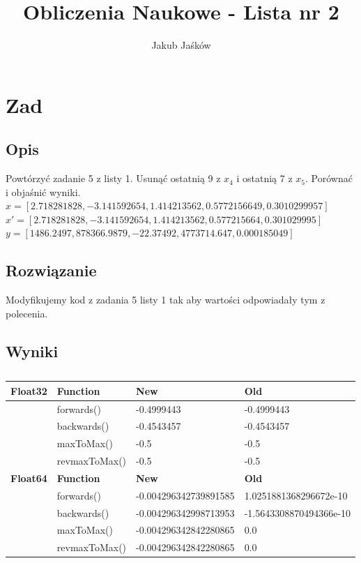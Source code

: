 \documentclass[10pt,a4paper, polish]{article}
\author{Jakub Jaśków}
\title{Obliczenia Naukowe - Lista nr 2}
\begin{document}
\maketitle
\section{Zad}
\subsection*{Opis}
Powtórzyć zadanie 5 z listy 1. Usunąć ostatnią 9 z $x_4$ i ostatnią 7 z $x_5$. Porównać i objaśnić wyniki.\\
$x = [2.718281828, -3.141592654, 1.414213562, 0.5772156649, 0.3010299957]$\\
$x' = [2.718281828, -3.141592654, 1.414213562, 0.577215664, 0.301029995]$\\
$y = [1486.2497, 878366.9879, -22.37492, 4773714.647, 0.000185049]$
\subsection*{Rozwiązanie}
Modyfikujemy kod z zadania 5 listy 1 tak aby wartości odpowiadały tym z polecenia.
\subsection*{Wyniki}
\begin{table}[H]
\centering
\caption{}
\begin{tabular}{|l|l|l|l|}
\hline
\textbf{Float32} & \textbf{Function} & \textbf{New} & \textbf{Old} \\
\hline
& forwards() & -0.4999443 & -0.4999443 \\
& backwards() & -0.4543457 & -0.4543457 \\
& maxToMax() & -0.5 & -0.5 \\
& revmaxToMax() & -0.5 & -0.5 \\
\hline
\textbf{Float64} & \textbf{Function} & \textbf{New} & \textbf{Old} \\
\hline
& forwards() & -0.004296342739891585 & 1.0251881368296672e-10 \\
& backwards() & -0.004296342998713953 & -1.5643308870494366e-10 \\
& maxToMax() & -0.004296342842280865 & 0.0 \\
& revmaxToMax() & -0.004296342842280865 & 0.0 \\
\hline
\end{tabular}
\end{table}
\end{document}
